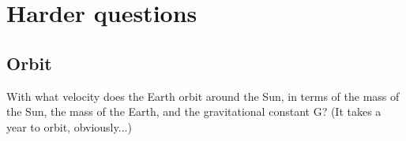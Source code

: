 \documentclass[12pt]{amsart}
\begin{document}
\section{Harder questions}

\subsection{Orbit}

With what velocity does the Earth orbit around the Sun, in terms of the mass of the Sun, the mass of the Earth, and the gravitational constant G? (It takes a year to orbit, obviously...)
\end{document}
